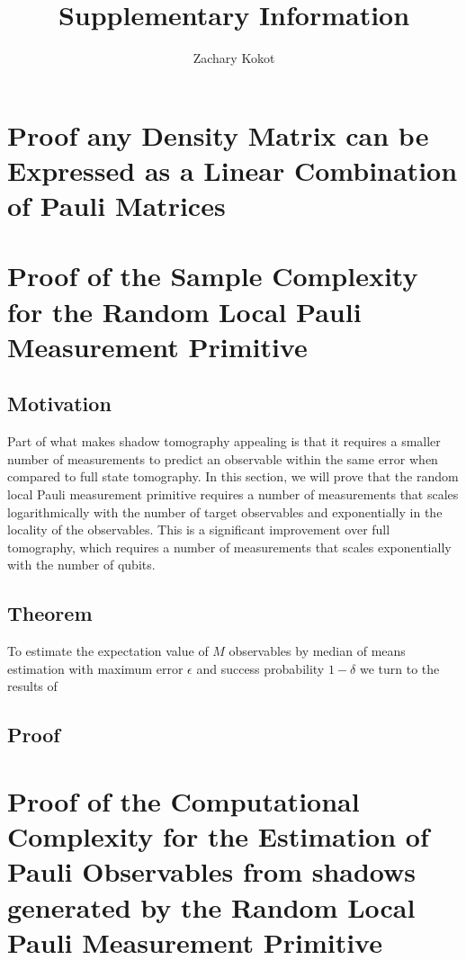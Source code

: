 \documentclass[12pt]{article}
\author{Zachary Kokot}
\title{Supplementary Information}
\begin{document}
    \maketitle

    \tableofcontents

    \newpage

    \section{Proof any Density Matrix can be Expressed as a Linear Combination of Pauli Matrices}

    \section{Proof of the Sample Complexity for the Random Local Pauli Measurement Primitive}

    \subsection{Motivation}
    Part of what makes shadow tomography appealing is that it requires a smaller number of measurements to predict an observable within the same error when compared to full state tomography. In this section, we will prove that the random local Pauli measurement primitive requires a number of measurements that scales logarithmically with the number of target observables and exponentially in the locality of the observables. This is a significant improvement over full tomography, which requires a number of measurements that scales exponentially with the number of qubits.

    \subsection{Theorem}
    To estimate the expectation value of $M$ observables by median of means estimation with maximum error $\epsilon$ and success probability $1-\delta$ we turn to the results of 

    \subsection{Proof}

    \section{Proof of the Computational Complexity for the Estimation of Pauli Observables from shadows generated by the Random Local Pauli Measurement Primitive}
\end{document}
